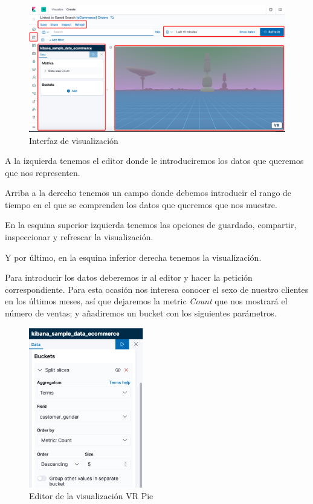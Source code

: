 \documentclass[a4paper, 12pt]{book}
\begin{document}
\begin{figure}[H]
  \centering
  \includegraphics[width=14cm, keepaspectratio]{img/development/interfaz-visualizacion.png}
  \caption{Interfaz de visualización}
  \label{fig:interfazvisualizacion}
\end{figure}

A la izquierda tenemos el editor donde le introduciremos los datos que queremos que nos representen.

Arriba a la derecho tenemos un campo donde debemos introducir el rango de tiempo en el que se comprenden los datos que queremos que nos muestre.

En la esquina superior izquierda tenemos las opciones de guardado, compartir, inspeccionar y refrescar la visualización.

Y por último, en la esquina inferior derecha tenemos la visualización.

Para introducir los datos deberemos ir al editor y hacer la petición correspondiente. Para esta ocasión nos interesa conocer el sexo de nuestro clientes en los últimos meses, así que dejaremos la metric \textit{Count} que nos mostrará el número de ventas; y añadiremos un bucket con los siguientes parámetros.

\begin{figure}[H]
  \centering
  \includegraphics[width=5cm, keepaspectratio]{img/development/editor-pie.png}
  \caption{Editor de la visualización VR Pie}
  \label{fig:editorpie}
\end{figure}
\end{document}
